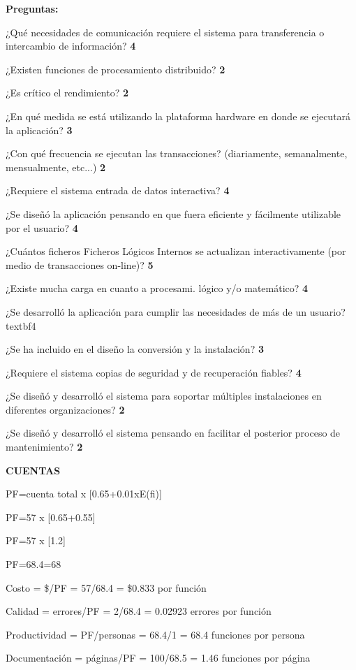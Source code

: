 \documentclass[10pt]{article}
\begin{document}
\newpage

\textbf{Preguntas:}

¿Qué necesidades de comunicación requiere el sistema para transferencia o intercambio de información? \textbf{4}

¿Existen funciones de procesamiento distribuido?  \textbf{2}

¿Es crítico el rendimiento?  \textbf{2}

¿En qué medida se está utilizando la plataforma hardware en donde se ejecutará la aplicación? \textbf{3}

¿Con qué frecuencia se ejecutan las transacciones? (diariamente, semanalmente, mensualmente, etc...)  \textbf{2}

¿Requiere el sistema entrada de datos interactiva? \textbf{4}

¿Se diseñó la aplicación pensando en que fuera eficiente y fácilmente utilizable por el usuario?  \textbf{4}

¿Cuántos ficheros Ficheros Lógicos Internos se actualizan interactivamente (por medio de transacciones on-line)? \textbf{5}

¿Existe mucha carga en cuanto a procesami. lógico y/o matemático?  \textbf{4}

¿Se desarrolló la aplicación para cumplir las necesidades de más de un usuario?  textbf{4}

¿Se ha incluido en el diseño la conversión y la instalación?  \textbf{3}

¿Requiere el sistema copias de seguridad y de recuperación fiables?  \textbf{4}

¿Se diseñó y desarrolló el sistema para soportar múltiples instalaciones en diferentes organizaciones? \textbf{2} 

¿Se diseñó y desarrolló el sistema pensando en facilitar el posterior proceso de mantenimiento? \textbf{2}

\textbf{CUENTAS}

PF=cuenta total x [0.65+0.01xE(fi)]

PF=57 x [0.65+0.55]

PF=57 x [1.2]

PF=68.4=68

Costo = \$/PF = 57/68.4 = \$0.833 por función

Calidad = errores/PF = 2/68.4 = 0.02923 errores por función

Productividad = PF/personas = 68.4/1 = 68.4 funciones por 
persona

Documentación = páginas/PF = 100/68.5 = 1.46 funciones por página
\end{document}
